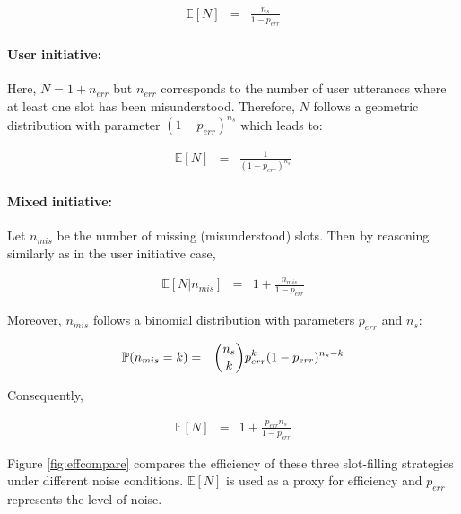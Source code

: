                      \begin{eqnarray}
                       \mathbb{E} [N] & = & \frac{n_s}{1-p_{err}}
                     \end{eqnarray}

                \paragraph{User initiative:} Here, $N = 1 + n_{err}$  but $n_{err}$ corresponds to the number of user utterances where at least one slot has been misunderstood. Therefore, $N$ follows a geometric distribution with parameter $(1-p_{err})^{n_s}$ which leads to:

                     \begin{eqnarray}
                       \mathbb{E} [N] & = & \frac{1}{(1-p_{err})^{n_s}}
                     \end{eqnarray}

                \paragraph{Mixed initiative:} Let $n_{mis}$ be the number of missing (misunderstood) slots. Then by reasoning similarly as in the user initiative case,
								
											\begin{eqnarray}
												\mathbb{E} [N | n_{mis}] & = & 1 + \frac{n_{mis}}{1-p_{err}}
											\end{eqnarray}

                     Moreover, $n_{mis}$ follows a binomial distribution with parameters $p_{err}$ and $n_s$:
										
											\begin{eqnarray}
												\mathbb{P} (n_{mis} = k) & = & \dbinom{n_s}{k} p_{err}^k (1-p_{err})^{n_s-k}
											\end{eqnarray}
										
										Consequently,

                     \begin{eqnarray}
                       \mathbb{E} [N] & = & 1 + \frac{p_{err} n_s}{1-p_{err}}
                     \end{eqnarray}
										
								Figure \ref{fig:effcompare} compares the efficiency of these three slot-filling strategies under different noise conditions. $\mathbb{E} [N]$ is used as a proxy for efficiency and $p_{err}$ represents the level of noise.
								
